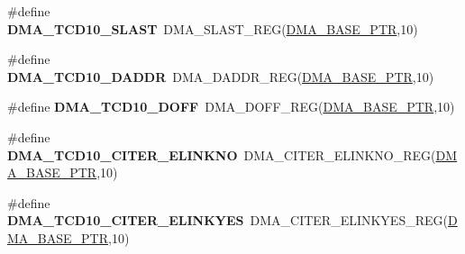 \begin{DoxyCompactItemize}
\item 
\hypertarget{group___d_m_a___register___accessor___macros_ga8cb4717fe169f84271e8975cc5903950}{}\#define {\bfseries D\+M\+A\+\_\+\+T\+C\+D10\+\_\+\+S\+L\+A\+S\+T}~D\+M\+A\+\_\+\+S\+L\+A\+S\+T\+\_\+\+R\+E\+G(\hyperlink{group___d_m_a___peripheral_ga6997fbc1b1973e9f27170217a3bd6f22}{D\+M\+A\+\_\+\+B\+A\+S\+E\+\_\+\+P\+T\+R},10)\label{group___d_m_a___register___accessor___macros_ga8cb4717fe169f84271e8975cc5903950}

\item 
\hypertarget{group___d_m_a___register___accessor___macros_ga659dd82f494760eb11d0dcb7abe58624}{}\#define {\bfseries D\+M\+A\+\_\+\+T\+C\+D10\+\_\+\+D\+A\+D\+D\+R}~D\+M\+A\+\_\+\+D\+A\+D\+D\+R\+\_\+\+R\+E\+G(\hyperlink{group___d_m_a___peripheral_ga6997fbc1b1973e9f27170217a3bd6f22}{D\+M\+A\+\_\+\+B\+A\+S\+E\+\_\+\+P\+T\+R},10)\label{group___d_m_a___register___accessor___macros_ga659dd82f494760eb11d0dcb7abe58624}

\item 
\hypertarget{group___d_m_a___register___accessor___macros_gad4889efa76dd652b839b05370678f1c9}{}\#define {\bfseries D\+M\+A\+\_\+\+T\+C\+D10\+\_\+\+D\+O\+F\+F}~D\+M\+A\+\_\+\+D\+O\+F\+F\+\_\+\+R\+E\+G(\hyperlink{group___d_m_a___peripheral_ga6997fbc1b1973e9f27170217a3bd6f22}{D\+M\+A\+\_\+\+B\+A\+S\+E\+\_\+\+P\+T\+R},10)\label{group___d_m_a___register___accessor___macros_gad4889efa76dd652b839b05370678f1c9}

\item 
\hypertarget{group___d_m_a___register___accessor___macros_gacb96c7d83ed3e4a7d09e164668dbfb40}{}\#define {\bfseries D\+M\+A\+\_\+\+T\+C\+D10\+\_\+\+C\+I\+T\+E\+R\+\_\+\+E\+L\+I\+N\+K\+N\+O}~D\+M\+A\+\_\+\+C\+I\+T\+E\+R\+\_\+\+E\+L\+I\+N\+K\+N\+O\+\_\+\+R\+E\+G(\hyperlink{group___d_m_a___peripheral_ga6997fbc1b1973e9f27170217a3bd6f22}{D\+M\+A\+\_\+\+B\+A\+S\+E\+\_\+\+P\+T\+R},10)\label{group___d_m_a___register___accessor___macros_gacb96c7d83ed3e4a7d09e164668dbfb40}

\item 
\hypertarget{group___d_m_a___register___accessor___macros_ga4a9afa879af2aa3200e1f24dd95c92de}{}\#define {\bfseries D\+M\+A\+\_\+\+T\+C\+D10\+\_\+\+C\+I\+T\+E\+R\+\_\+\+E\+L\+I\+N\+K\+Y\+E\+S}~D\+M\+A\+\_\+\+C\+I\+T\+E\+R\+\_\+\+E\+L\+I\+N\+K\+Y\+E\+S\+\_\+\+R\+E\+G(\hyperlink{group___d_m_a___peripheral_ga6997fbc1b1973e9f27170217a3bd6f22}{D\+M\+A\+\_\+\+B\+A\+S\+E\+\_\+\+P\+T\+R},10)\label{group___d_m_a___register___accessor___macros_ga4a9afa879af2aa3200e1f24dd95c92de}


\end{DoxyCompactItemize}
